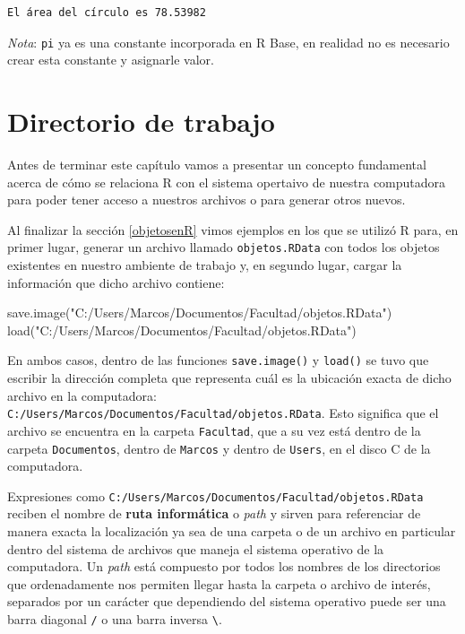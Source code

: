 \documentclass[
]{book}
\newenvironment{Shaded}{\begin{snugshade}}{\end{snugshade}}
\newcommand{\FunctionTok}[1]{\textcolor[rgb]{0.00,0.00,0.00}{#1}}
\newcommand{\NormalTok}[1]{#1}
\newcommand{\StringTok}[1]{\textcolor[rgb]{0.31,0.60,0.02}{#1}}
\begin{document}
\begin{verbatim}
El área del círculo es 78.53982
\end{verbatim}

\emph{Nota}: \texttt{pi} ya es una constante incorporada en R Base, en realidad no es necesario crear esta constante y asignarle valor.

\hypertarget{directorio-de-trabajo}{%
\section{Directorio de trabajo}\label{directorio-de-trabajo}}

Antes de terminar este capítulo vamos a presentar un concepto fundamental acerca de cómo se relaciona R con el sistema opertaivo de nuestra computadora para poder tener acceso a nuestros archivos o para generar otros nuevos.

Al finalizar la sección \ref{objetosenR} vimos ejemplos en los que se utilizó R para, en primer lugar, generar un archivo llamado \texttt{objetos.RData} con todos los objetos existentes en nuestro ambiente de trabajo y, en segundo lugar, cargar la información que dicho archivo contiene:

\begin{Shaded}
\begin{Highlighting}[]
\FunctionTok{save.image}\NormalTok{(}\StringTok{"C:/Users/Marcos/Documentos/Facultad/objetos.RData"}\NormalTok{)}
\FunctionTok{load}\NormalTok{(}\StringTok{"C:/Users/Marcos/Documentos/Facultad/objetos.RData"}\NormalTok{)}
\end{Highlighting}
\end{Shaded}

En ambos casos, dentro de las funciones \texttt{save.image()} y \texttt{load()} se tuvo que escribir la dirección completa que representa cuál es la ubicación exacta de dicho archivo en la computadora: \texttt{C:/Users/Marcos/Documentos/Facultad/objetos.RData}. Esto significa que el archivo se encuentra en la carpeta \texttt{Facultad}, que a su vez está dentro de la carpeta \texttt{Documentos}, dentro de \texttt{Marcos} y dentro de \texttt{Users}, en el disco C de la computadora.

Expresiones como \texttt{C:/Users/Marcos/Documentos/Facultad/objetos.RData} reciben el nombre de \textbf{ruta informática} o \emph{path} y sirven para referenciar de manera exacta la localización ya sea de una carpeta o de un archivo en particular dentro del sistema de archivos que maneja el sistema operativo de la computadora. Un \emph{path} está compuesto por todos los nombres de los directorios que ordenadamente nos permiten llegar hasta la carpeta o archivo de interés, separados por un carácter que dependiendo del sistema operativo puede ser una barra diagonal \texttt{/} o una barra inversa \texttt{\textbackslash{}}.
\end{document}
